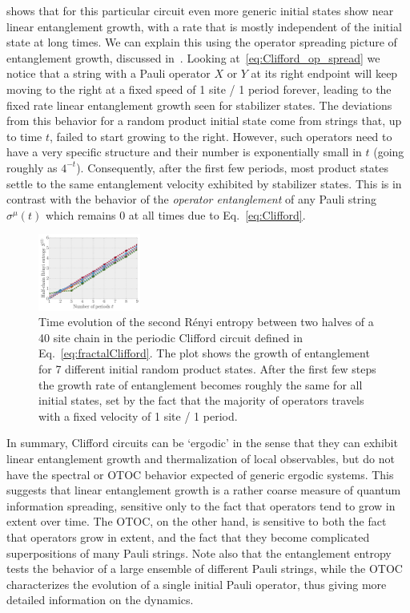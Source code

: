 \documentclass[aps,prb,twocolumn,superscriptaddress]{revtex4-1}
\begin{document}
 shows that for this particular circuit even more generic initial states show near linear entanglement growth, with a rate that is mostly independent of the initial state at long times. We can explain this using the operator spreading picture of entanglement growth, discussed in~. Looking at~\eqref{eq:Clifford_op_spread} we notice that a string with a Pauli operator $X$ or $Y$ at its right endpoint will keep moving to the right at a fixed speed of 1 site / 1 period forever, leading to the fixed rate linear entanglement growth seen for stabilizer states. The deviations from this behavior for a random product initial state come from strings that, up to time $t$, failed to start growing to the right. However, such operators need to have a very specific structure and their number is exponentially small in $t$ (going roughly as $4^{-t}$). Consequently, after the first few periods, most product states settle to the same entanglement velocity exhibited by stabilizer states. This is in contrast with the behavior of the \emph{operator entanglement} of any Pauli string $\sigma^\mu(t)$ which remains 0 at all times due to Eq.~\eqref{eq:Clifford}.


 \begin{figure}[h!]
 \centering
  	\includegraphics[width=0.3\textwidth]{Clifford_Renyi_spreading.pdf} 
\caption{Time evolution of the second R\'enyi entropy between two halves of a 40 site chain in the periodic Clifford circuit defined in Eq.~\eqref{eq:fractalClifford}. The plot shows the growth of entanglement for 7 different initial random product states. After the first few steps the growth rate of entanglement becomes roughly the same for all initial states, set by the fact that the majority of operators travels with a fixed velocity of 1 site / 1 period.}
 \label{fig:Clifford_entanglement}
 \end{figure}

In summary, Clifford circuits can be `ergodic' in the sense that they can exhibit linear entanglement growth and thermalization of local observables, but do not have the spectral or OTOC behavior expected of generic ergodic systems. This suggests that linear entanglement growth is a rather coarse measure of quantum information spreading, sensitive only to the fact that operators tend to grow in extent over time. The OTOC, on the other hand, is sensitive to both the fact that operators grow in extent, and the fact that they become complicated superpositions of many Pauli strings. Note also that the entanglement entropy tests the behavior of a large ensemble of different Pauli strings, while the OTOC characterizes the evolution of a single initial Pauli operator, thus giving more detailed information on the dynamics.
 
\end{document}
